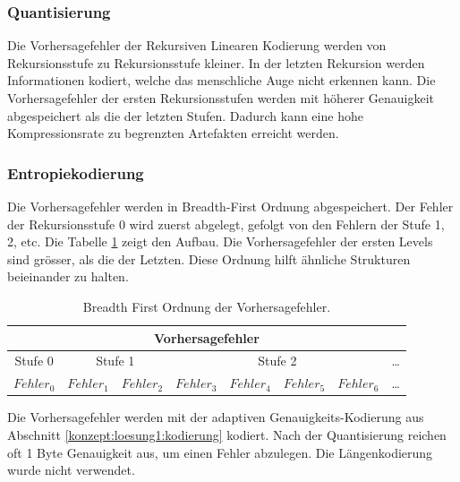 \subsubsection{Quantisierung} \label{konzept:loesung2:resudial_quant}
Die Vorhersagefehler der Rekursiven Linearen Kodierung werden von Rekursionsstufe zu Rekursionsstufe kleiner. In der letzten Rekursion werden Informationen kodiert, welche das menschliche Auge nicht erkennen kann. Die Vorhersagefehler der ersten Rekursionsstufen werden mit höherer Genauigkeit abgespeichert als die der letzten Stufen. Dadurch kann eine hohe Kompressionsrate zu begrenzten Artefakten erreicht werden.

\subsubsection{Entropiekodierung}
Die Vorhersagefehler werden in Breadth-First Ordnung abgespeichert. Der Fehler der Rekursionsstufe 0 wird zuerst abgelegt, gefolgt von den Fehlern der Stufe 1, 2, etc. Die Tabelle \ref{konzept:loesung2:entropie:breath} zeigt den Aufbau. Die Vorhersagefehler der ersten Levels sind grösser, als die der Letzten. Diese Ordnung hilft ähnliche Strukturen beieinander zu halten.

\begin{table}[!htbp]
	\center
	\begin{tabular}{|c||c|c||c|c|c|c||c}
		\hline
		\multicolumn{8}{|c|}{Vorhersagefehler}\\\hline\hline
		 Stufe 0& \multicolumn{2}{|c||}{Stufe 1} & \multicolumn{4}{|c||}{Stufe 2} &\ldots \\\hline
		$Fehler_0$ & $Fehler_1$ &$Fehler_2$ &$Fehler_3$ & $Fehler_4$ & $Fehler_5$ & $Fehler_6$   & \ldots \\\hline
	\end{tabular}
	\caption{Breadth First Ordnung der Vorhersagefehler.}
	\label{konzept:loesung2:entropie:breath}
\end{table}
Die Vorhersagefehler werden mit der adaptiven Genauigkeits-Kodierung aus Abschnitt \ref{konzept:loesung1:kodierung} kodiert. Nach der Quantisierung reichen oft 1 Byte Genauigkeit aus, um einen Fehler abzulegen. Die Längenkodierung wurde nicht verwendet.